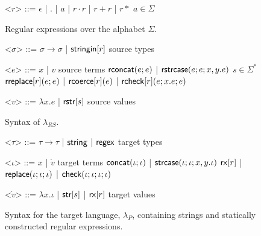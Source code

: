 \documentclass[11pt,leqno]{article}
\theoremstyle{definition}
\newcommand{\lambdap}{\lambda_P}
\newcommand{\sisubst}[3]{{\sf rreplace}[#1](#2;#3)} \newcommand{\rreplace}[3]{{\sf rreplace}[#1](#2;#3)} %
\newcommand{\rcoerce}[2]{{\sf rcoerce}[#1](#2)}
\newcommand{\sistr}[1]{{\sf rstr}[#1]}   \newcommand{\rstr}[1]{{\sf rstr}[#1]} %
\newcommand{\rcheck}[4]{ {\sf rcheck}[#1](#2;#3;#4) }
\newcommand{\strin}[1]{\sistr{#1}}
\newcommand{\rsconcat}[2]{{\sf rconcat}(#1;#2)} \newcommand{\rconcat}[2]{{\sf rconcat}(#1;#2)} %
\newcommand{\stringin}[1]{{\sf stringin}[#1]}
\newcommand{\tcheck}[4]{{\sf check}(#1; #2; #3; #4)}
\renewcommand{\tstr}[1]{{{\sf str}[#1]}}
\newcommand{\preplace}[3]{{\sf replace}(#1;#2;#3)}
\newcommand{\tconcat}[2]{{\sf concat}(#1;#2)} \newcommand{\concat}[2]{{\sf concat}(#1;#2)} %
\newcommand{\rx}[1]{ {\sf rx}[#1] }
\newcommand{\str}{{\sf string}}
\newcommand{\regex}{{\sf regex}}
\newcommand{\strcase}[3]{ {\sf rstrcase}(#1; #2; #3)}
\newcommand{\pstrcase}[3]{ {\sf strcase}(#1; #2; #3)}
\begin{document}
\newpage

\renewcommand{\grammarlabel}[2]{#1\hfill#2}
\begin{figure}[b]
\small
  \begin{grammar}
<$r$> ::= $\epsilon$ | $.$ | $a$ | $r \cdot r$ | $r + r$ | $r*$ \hfill $a \in \Sigma$

\caption{Regular expressions over the alphabet $\Sigma$.}
\label{fig:regex}
\end{grammar}
\end{figure}
\begin{figure}[t]
\small
  \begin{grammar}
<$\sigma$> ::=  $\sigma \rightarrow \sigma$ | $\stringin{r}$    \hfill  source types

<$e$> ::= 
      $x$ | $v$ \hfill source terms \alt 
      $\rsconcat{e}{e}$ | $\strcase{e}{e}{x,y.e}$ \hfill $s \in \Sigma^{*}$ \alt
      $\sisubst{r}{e}{e}$ | $\rcoerce{r}{e}$ | $\rcheck{r}{e}{x.e}{e}$

<$v$> ::= $\lambda x . e$ | $\strin{s}$ \hfill source values 
\caption{Syntax of $\lambda_{RS}$.}
\label{fig:glambdas}
\end{grammar}
\end{figure}


\renewcommand{\grammarlabel}[2]{#1\hfill#2}

\begin{figure}[t]
\small
  \begin{grammar}

<$\tau$> ::= $\tau \rightarrow \tau$ | $\str$ | $\regex$ \hfill target types

<$\iota$> ::= $x$ | $\dot{v}$ \hfill target terms \alt
$\tconcat{\iota}{\iota}$ | $\pstrcase{\iota}{\iota}{x,y.\iota}$ \alt
  $\rx{r}$ | $\preplace{\iota}{\iota}{\iota}$ | $\tcheck{\iota}{\iota}{\iota}{\iota}$ 

  <$\dot{v}$> ::= $\lambda x . \iota$ | $\tstr{s}$ | $\rx{r}$ \hfill target values

\end{grammar}
\caption{Syntax for the target language, $\lambdap$, containing strings and statically constructed regular expressions.}
\label{fig:lcsSyntax}
\end{figure}
\end{document}
